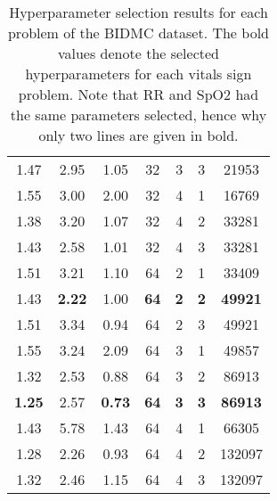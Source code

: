 \begin{table}[t]
\begin{center}
\begin{tabular}{ccccccc}
        1.47 &      2.95 &      1.05 &         32 &                        3 &          3 &       21953 \\
        1.55 &      3.00 &      2.00 &         32 &                        4 &          1 &       16769 \\
        1.38 &      3.20 &      1.07 &         32 &                        4 &          2 &       33281 \\
        1.43 &      2.58 &      1.01 &         32 &                        4 &          3 &       33281 \\
        1.51 &      3.21 &      1.10 &         64 &                        2 &          1 &       33409 \\
        1.43 &     \textbf{ 2.22} & 1.00 &         \textbf{64} &                        \textbf{2} &          \textbf{2} &       \textbf{49921} \\
        1.51 &      3.34 &      0.94 &         64 &                        2 &          3 &       49921 \\
        1.55 &      3.24 &      2.09 &         64 &                        3 &          1 &       49857 \\
        1.32 &      2.53 &      0.88 &         64 &                        3 &          2 &       86913 \\
        \textbf{1.25} &      2.57 &      \textbf{0.73} &         \textbf{64} &                        \textbf{3} &         \textbf{3} &       \textbf{86913} \\
        1.43 &      5.78 &      1.43 &         64 &                        4 &          1 &       66305 \\
        1.28 &      2.26 &      0.93 &         64 &                        4 &          2 &      132097 \\
        1.32 &      2.46 &      1.15 &         64 &                        4 &          3 &      132097 \\
        \bottomrule
        \end{tabular}
    \end{center}
    \caption{Hyperparameter selection results for each problem of the BIDMC dataset. The bold values denote the selected hyperparameters for each vitals sign problem. Note that RR and SpO2 had the same parameters selected, hence why only two lines are given in bold.}
    \label{tab:bidmc_hyper}
\end{table}